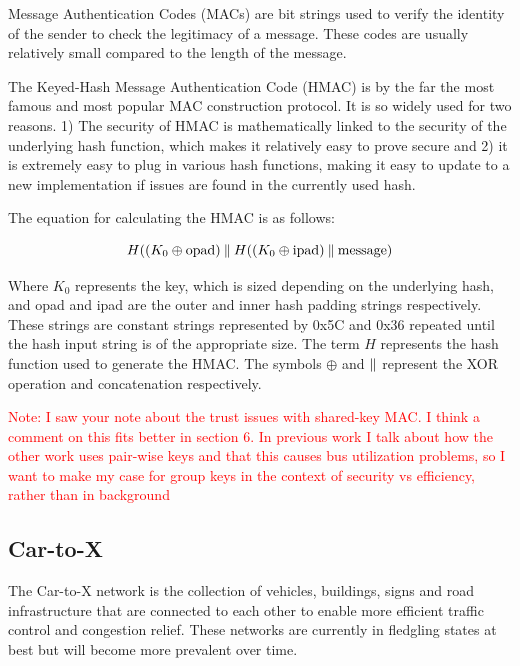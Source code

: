 Message Authentication Codes (MACs) are bit strings used to verify the identity of the sender to check the legitimacy of a message. These codes are usually relatively small compared to the length of the message. 


The Keyed-Hash Message Authentication Code (HMAC)\cite{HMAC}\cite{FIPS-198-1} is by the far the most famous and most popular MAC construction protocol. It is so widely used for two reasons. 1) The security of HMAC is mathematically linked to the security of the underlying hash function, which makes it relatively easy to prove secure and 2) it is extremely easy to plug in various hash functions, making it easy to update to a new implementation if issues are found in the currently used hash.

The equation for calculating the HMAC is as follows: 

\begin{equation}
H((K_0\oplus \text{opad})\mathbin{\|} H((K_0\oplus \text{ipad})\mathbin{\|} \text{message})
\end{equation}

Where $K_0$ represents the key, which is sized depending on the underlying hash, and opad and ipad are the outer and inner hash padding strings respectively. These strings are constant strings represented by 0x5C and 0x36 repeated until the hash input string is of the appropriate size. The term $H$ represents the hash function used to generate the HMAC. The symbols $\oplus$ and $\mathbin{\|}$ represent the XOR operation and concatenation respectively. \cite{FIPS-198-1}

\textcolor{red}{Note: I saw your note about the trust issues with shared-key MAC. I think a comment on this fits better in section 6. In previous work I talk about how the other work uses pair-wise keys and that this causes bus utilization problems, so I want to make my case for group keys in the context of security vs efficiency, rather than in background}

\subsection{Car-to-X}
The Car-to-X network is the collection of vehicles, buildings, signs and road infrastructure that are connected to each other to enable more efficient traffic control and congestion relief. These networks are currently in fledgling states at best but will become more prevalent over time\cite{C2X}.
